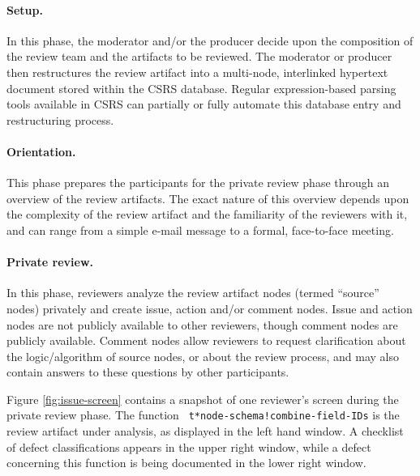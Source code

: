 \paragraph{Setup.} In this phase, the moderator and/or the producer
decide upon the composition of the review team and the artifacts to be
reviewed. The moderator or producer then restructures the review artifact
into a multi-node, interlinked hypertext document stored within the CSRS
database.  Regular expression-based parsing tools available in CSRS can
partially or fully automate this database entry and restructuring process.

\paragraph{Orientation.} This phase prepares the participants for the
private review phase through an overview of the review artifacts.  The
exact nature of this overview depends upon the complexity of the
review artifact and the familiarity of the reviewers with it, and can range
from a simple e-mail message to a formal, face-to-face meeting.

\paragraph {Private review.} In this phase, reviewers analyze the
review artifact nodes (termed ``source'' nodes) privately and create issue,
action and/or comment nodes.  Issue and action nodes are not publicly
available to other reviewers, though comment nodes are publicly available.
Comment nodes allow reviewers to request clarification about the
logic/algorithm of source nodes, or about the review process, and may also
contain answers to these questions by other participants.

Figure \ref{fig:issue-screen} contains a snapshot of one reviewer's
screen during the private review phase.  The function {\tt
t*node-schema!combine-field-IDs} is the review artifact under
analysis, as displayed in the left hand window.  A checklist of defect
classifications appears in the upper right window, while a defect
concerning this function is being documented in the lower right
window.

\begin{figure*} [t]
 {\centerline{}}
\caption{{\em A CSRS screen illustrating the generation of an issue.}}
\label{fig:issue-screen}
\end{figure*}

